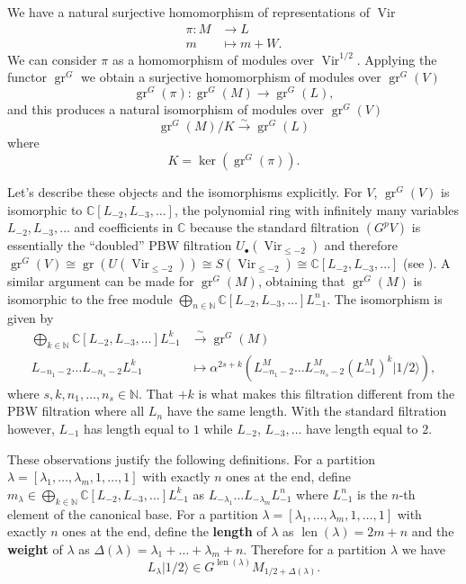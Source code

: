 \documentclass[12pt,a4paper]{article}
\DeclareMathOperator{\Vir}{Vir}
\DeclareMathOperator{\gr}{gr}
\DeclareMathOperator{\len}{len}
\newcommand{\vachalf}{|1/2\rangle}
\begin{document}
We have a natural surjective homomorphism of representations of $\Vir$
\begin{align*}
  \pi:M&\to L \\
  m&\mapsto m+W.
\end{align*}
We can consider $\pi$ as a homomorphism of modules over $\Vir^{1/2}$.
Applying the functor $\gr^G$ we obtain a surjective homomorphism of modules over $\gr^G(V)$
\begin{equation*}
  \gr^G(\pi):\gr^G(M)\to \gr^G(L),
\end{equation*}
and this produces a natural isomorphism of modules over $\gr^G(V)$
\begin{equation*}
  \gr^G(M)/K\xrightarrow{\sim} \gr^G(L)
\end{equation*}
where
\begin{equation*}
K=\ker(\gr^G(\pi)).
\end{equation*}

Let's describe these objects and the isomorphisms explicitly.
For $V$, $\gr^G(V)$ is isomorphic to $\mathbb{C}[L_{-2},L_{-3},\dots]$, the polynomial ring with infinitely many variables $L_{-2},L_{-3},\dots$ and coefficients in $\mathbb{C}$ because the standard filtration $(G^pV)$ is essentially the ``doubled'' PBW filtration $U_\bullet(\Vir_{\le -2})$ and therefore $\gr^G(V)\cong \gr(U(\Vir_{\le -2}))\cong S(\Vir_{\le -2})\cong \mathbb{C}[L_{-2},L_{-3},\dots]$ (see \cite[Chapter 2]{dixmier_enveloping_1996}).
A similar argument can be made for $\gr^G(M)$, obtaining that $\gr^G(M)$ is isomorphic to the free module $\bigoplus_{n\in \mathbb{N}}\mathbb{C}[L_{-2},L_{-3},\dots]L_{-1}^n$.
The isomorphism is given by
\begin{align*}
  \bigoplus_{k\in \mathbb{N}}\mathbb{C}[L_{-2},L_{-3},\dots]L_{-1}^k&\xrightarrow{\sim} \gr^G(M) \\
  L_{-n_1-2}\dots L_{-n_s-2}L_{-1}^k&\mapsto \alpha^{2s+k}(L_{-n_1-2}^M\dots L_{-n_s-2}^M(L_{-1}^M)^k\vachalf),
\end{align*}
where $s,k,n_1,\dots, n_s\in \mathbb{N}$.
That $+k$ is what makes this filtration different from the PBW filtration where all $L_n$ have the same length.
With the standard filtration however, $L_{-1}$ has length equal to $1$ while $L_{-2}$, $L_{-3},\dots$ have length equal to $2$.

These observations justify the following definitions.
For a partition $\lambda=[\lambda_1,\dots, \lambda_m,1,\dots,1]$ with exactly $n$ ones at the end, define $m_\lambda\in \bigoplus_{k\in \mathbb{N}}\mathbb{C}[L_{-2},L_{-3},\dots]L_{-1}^k$ as $L_{-\lambda_1}\dots L_{-\lambda_m}L_{-1}^n$ where $L_{-1}^n$ is the $n$-th element of the canonical base.
For a partition $\lambda=[\lambda_1,\dots, \lambda_m,1,\dots,1]$ with exactly $n$ ones at the end, define the \textbf{length} of $\lambda$ as $\len(\lambda)=2m+n$ and the \textbf{weight} of $\lambda$ as $\Delta(\lambda)=\lambda_1+\dots +\lambda_m+n$.
Therefore for a partition $\lambda$ we have
\begin{equation*}
  L_{\lambda}\vachalf\in G^{\len(\lambda)}M_{1/2+\Delta(\lambda)}.
\end{equation*}
\end{document}
